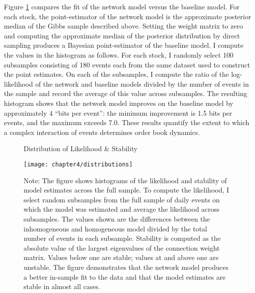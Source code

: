 		Figure \ref{fig:distributions} compares the fit of the network model versus the baseline model. For each stock, the point-estimator of the network model is the approximate posterior median of the Gibbs sample described above. Setting the weight matrix to zero and computing the approximate median of the posterior distribution by direct sampling produces a Bayesian point-estimator of the baseline model. I compute the values in the histogram as follows. For each stock, I randomly select 100 subsamples consisting of 180 events each from the same dataset used to construct the point estimates. On each of the subsamples, I compute the ratio of the log-likelihood of the network and baseline models divided by the number of events in the sample and record the average of this value across subsamples. The resulting histogram shows that the network model improves on the baseline model by approximately 4 ``bits per event'': the minimum improvement is 1.5 bits per events, and the maximum exceeds 7.0. These results quantify the extent to which a complex interaction of events determines order book dynamics.

		\begin{figure}[p]
			\small
			\linespread{1}
			\centering
			\captionsetup{labelsep=colon, font=footnotesize, justification=centerfirst, width=\linewidth}
			\caption{Distribution of Likelihood \& Stability}
			\label{fig:distributions}
			\texttt{[image: chapter4/distributions]}
			\captionsetup{position=below, font=footnotesize, justification=justified, width=\linewidth}
			\caption*{Note: The figure shows histograms of the likelihood and stability of model estimates across the full sample. To compute the likelihood, I select random subsamples from the full sample of daily events on which the model was estimated and average the likelihood across subsamples. The values shown are the differences between the inhomogeneous and homogeneous model divided by the total number of events in each subsample. Stability is computed as the absolute value of the largest eigenvalues of the connection weight matrix. Values below one are stable; values at and above one are unstable.  The figure demonstrates that the network model produces a better in-sample fit to the data and that the model estimates are stable in almost all cases.}
		\end{figure}

